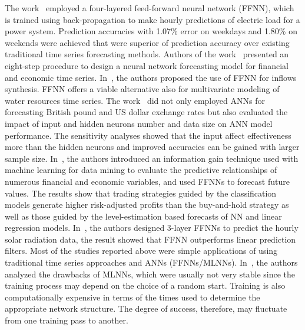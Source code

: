 \documentclass[11pt,twoside]{article}
\begin{document}
\begin{multicols}{2}
The work~\citep{ref_srinivasan} employed a four-layered feed-forward neural network (FFNN), which is trained using back-propagation to make hourly predictions of electric load for a power system. Prediction accuracies with 1.07\% error on weekdays and 1.80\% on weekends were achieved that were superior of prediction accuracy over existing traditional time series forecasting methods. 
Authors of the work~\citep{ref_kaastra} presented an eight-step procedure to design a neural network forecasting model for financial and economic time series. In~\citep{ref_raman}, the authors proposed the use of FFNN for inflows synthesis. FFNN offers a viable alternative also for multivariate modeling of water resources time series. The work~\citep{ref_zhang} did not only employed ANNs for forecasting British pound and US dollar exchange rates but also evaluated the impact of input and hidden neurons number and data size on ANN model performance. The sensitivity analyses showed that the input affect effectiveness more than the hidden neurons and improved accuracies can be gained with larger sample size. In~\citep{ref_enke}, the authors introduced an information gain technique used with machine learning for data mining to evaluate the predictive relationships of numerous financial and economic variables, and used FFNNs to forecast future values. The results show that trading strategies guided by the classification models generate higher risk-adjusted profits than the buy-and-hold strategy as well as those guided by the level-estimation based forecasts of NN and linear regression models. In~\citep{ref_hocaoglu}, the authors designed 3-layer FFNNs to predict the hourly solar radiation data, the result showed that FFNN outperforms linear prediction filters. Most of the studies reported above were simple applications of using traditional time series approaches and ANNs (FFNNs/MLNNs). In~\citep{ref_enke}, the authors analyzed the drawbacks of MLNNs, which were usually not very stable since the training process may depend on the choice of a random start. Training is also computationally expensive in terms of the times used to determine the appropriate network structure. The degree of success, therefore, may fluctuate from one training pass to another.


\end{multicols}
\end{document}
